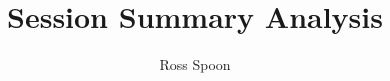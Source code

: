 \documentclass{article}
\title{Session Summary Analysis}
\author{Ross Spoon}
\begin{document}
\begin{table}[!htb]
\centering

\end{table}
\end{document}
